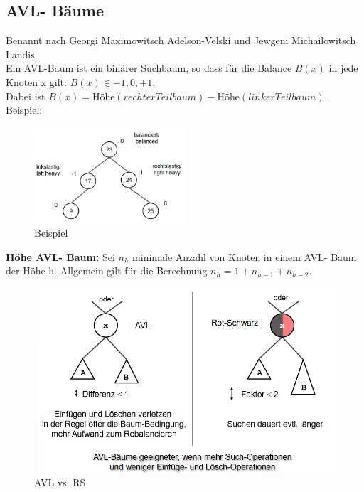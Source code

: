 \documentclass{article}
\begin{document}
        \subsection{AVL- Bäume}
            Benannt nach Georgi Maximowitsch Adelson-Velski und Jewgeni Michailowitsch Landis. \\
            Ein AVL-Baum ist ein binärer Suchbaum, so dass für die Balance $B(x)$ in jede Knoten x gilt: $B(x)\in{-1, 0, +1}$.\\
            Dabei ist $B(x)= \text{Höhe}(rechter Teilbaum)- \text{Höhe}(linker Teilbaum)$.\\
            Beispiel:
            \begin{figure}[ht]
                \centering
                \includegraphics[width=0.5\textwidth]{Bilder/AVLEx.png}
                \caption{Beispiel}
                \label{fig:AVLEx}
            \end{figure}
            \newpage
            \textbf{Höhe AVL- Baum:} Sei $n_h$ minimale Anzahl von Knoten in einem AVL- Baum der Höhe h. Allgemein gilt für die Berechnung $n_h=1+n_{h-1}+n_{h-2}$.\\
            \begin{figure}[ht]
                \centering
                \includegraphics[width=1\textwidth]{Bilder/AVLvsRS.png}
                \caption{AVL vs. RS}
                \label{fig:AVLvsRS}
            \end{figure}\\
\end{document}
